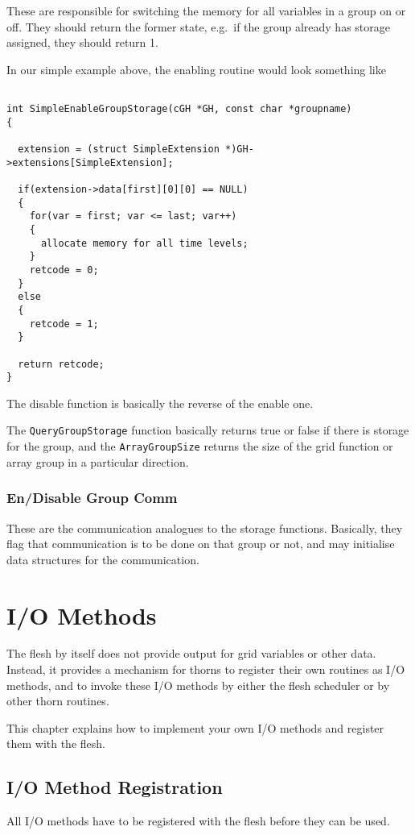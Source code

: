 These are responsible for switching the memory for all variables
in a group on or off.  They should return the former state, e.g.\
if the group already has storage assigned, they should return 1.

In our simple example above, the enabling routine would look
something like

\begin{verbatim}

int SimpleEnableGroupStorage(cGH *GH, const char *groupname)
{

  extension = (struct SimpleExtension *)GH->extensions[SimpleExtension];

  if(extension->data[first][0][0] == NULL)
  {
    for(var = first; var <= last; var++)
    {
      allocate memory for all time levels;
    }
    retcode = 0;
  }
  else
  {
    retcode = 1;
  }

  return retcode;
}

\end{verbatim}

The disable function is basically the reverse of the enable one.

The {\tt QueryGroupStorage} function basically returns true or false if
there is storage for the group, and the {\tt ArrayGroupSize} returns the
size of the grid function or array group in a particular direction.

\subsubsection{En/Disable Group Comm}

These are the communication analogues to the storage functions.  Basically,
they flag that communication is to be done on that group or not, and may
initialise data structures for the communication.


\section{I/O Methods}
\label{chap:io_methods}
%
The flesh by itself does not provide output for grid variables or other data.
Instead, it provides a mechanism for thorns to register their own
routines as I/O methods, and to invoke these I/O methods by either the
flesh scheduler or by other thorn routines.

This chapter explains how to implement your own I/O methods and register
them with the flesh.
%
\subsection{I/O Method Registration}
%
All I/O methods have to be registered with the flesh before they can be used.

